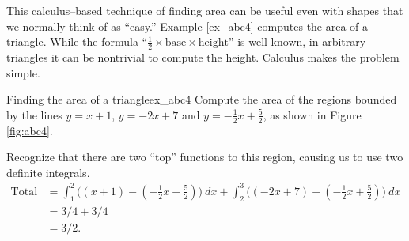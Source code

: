 %
This calculus--based technique of finding area can be useful even with shapes that we normally think of as ``easy.'' Example \ref{ex_abc4} computes the area of a triangle. While the formula ``$\frac12\times\text{base}\times\text{height}$'' is well known, in arbitrary triangles it can be nontrivial to compute the height. Calculus makes the problem simple.\\

\begin{example}{Finding the area of a triangle}{ex_abc4}
{
Compute the area of the regions bounded by the lines  $y=x+1$, $y=-2x+7$ and $y=-\frac12x+\frac52$, as shown in Figure \ref{fig:abc4}.}
\end{example}


\begin{solution}
{Recognize that there are two ``top'' functions to this region, causing us to use two definite integrals.
\begin{align*}
\text{Total Area} &= \int_1^2\big((x+1)-(-\frac12x+\frac52)\big)\ dx + \int_2^3\big((-2x+7)-(-\frac12x+\frac52)\big)\ dx \\
						&= 3/4+3/4\\
						&=3/2.
\end{align*}


}
\end{solution}
